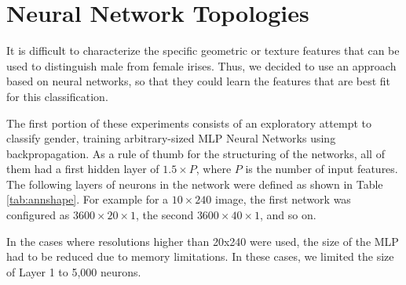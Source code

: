 \documentclass[10pt,twocolumn,letterpaper]{article}
\begin{document}


\section{Neural Network Topologies}
\label{nntopo}

It is difficult to characterize the specific geometric or texture features that can be used to distinguish male from female irises. Thus, we decided to use an approach based on neural networks, so that they could learn the features that are best fit for this classification.

The first portion of these experiments consists of an exploratory attempt to classify gender, training arbitrary-sized MLP Neural Networks using backpropagation. 
As a rule of thumb for the structuring of the networks, all of them had a first hidden layer of $1.5 \times P$, where $P$ is the number of input features. 
The following layers of neurons in the network were defined as shown in Table \ref{tab:annshape}. 
For example for a $10 \times 240$ image, the first network was configured as $3600 \times 20 \times 1$, the second $3600 \times 40 \times 1$, and so on.

In the cases where resolutions higher than 20x240 were used, the size of the MLP had to be reduced due to memory limitations. In these cases, we limited the size of Layer 1 to 5,000 neurons.

\begin{table}[H]
    \centering
    \caption{MLP neural network topologies used. $P$ is the number of input pixels.}
    \label{tab:annshape}
\end{table}
\end{document}
